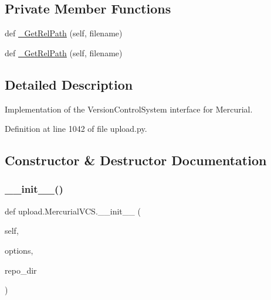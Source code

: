 \subsection*{Private Member Functions}
\begin{DoxyCompactItemize}
\item 
def \hyperlink{classupload_1_1MercurialVCS_a140da653b63106c4fa825f3ef5bf7701}{\+\_\+\+Get\+Rel\+Path} (self, filename)
\item 
def \hyperlink{classupload_1_1MercurialVCS_a140da653b63106c4fa825f3ef5bf7701}{\+\_\+\+Get\+Rel\+Path} (self, filename)
\end{DoxyCompactItemize}


\subsection{Detailed Description}
\begin{DoxyVerb}Implementation of the VersionControlSystem interface for Mercurial.\end{DoxyVerb}
 

Definition at line 1042 of file upload.\+py.



\subsection{Constructor \& Destructor Documentation}
\mbox{\label{classupload_1_1MercurialVCS_a33890f442dedbb7d9fd45c08b5baed56}} 
\subsubsection{\texorpdfstring{\+\_\+\+\_\+init\+\_\+\+\_\+()}{\_\_init\_\_()}\hspace{0.1cm}{\footnotesize\ttfamily [1/2]}}
{\footnotesize\ttfamily def upload.\+Mercurial\+V\+C\+S.\+\_\+\+\_\+init\+\_\+\+\_\+ (\begin{DoxyParamCaption}\item[{}]{self,  }\item[{}]{options,  }\item[{}]{repo\+\_\+dir }\end{DoxyParamCaption})}



